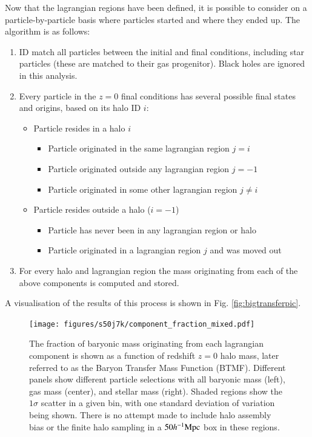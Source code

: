 Now that the lagrangian regions have been defined, it is possible to consider on
a particle-by-particle basis where particles started and where they ended up.
The algorithm is as follows:
\begin{enumerate}
	\item ID match all particles between the initial and final conditions, including
	      star particles (these are matched to their gas progenitor). Black holes
	      are ignored in this analysis.

	\item Every particle in the $z=0$ final conditions has several possible final
	      states and origins, based on its halo ID $i$:
	      \begin{itemize}
	            \item Particle resides in a halo $i$
	            \begin{itemize}
	           		\item Particle originated in the same lagrangian region $j = i$
	           		\item Particle originated outside any lagrangian region $j = -1$
	           		\item Particle originated in some other lagrangian region $j \neq i$
	            \end{itemize}
	            \item Particle resides outside a halo ($i = -1$)
	            \begin{itemize}
	            	\item Particle has never been in any lagrangian region or halo
	            	\item Particle originated in a lagrangian region $j$ and was moved out
	            \end{itemize}
	      \end{itemize}
	      
	\item For every halo and lagrangian region the mass originating from each
	      of the above components is computed and stored.
\end{enumerate}

A visualisation of the results of this process is shown in Fig. \ref{fig:bigtransferpic}.


\begin{figure}
	\centering
	\texttt{[image: figures/s50j7k/component\_fraction\_mixed.pdf]}
	\vspace{-0.7cm}
	\caption{
		The fraction of baryonic mass originating from each lagrangian component is
		shown as a function of redshift $z=0$ halo mass, later referred to as the
		Baryon Transfer Mass Function (BTMF). Different panels show different
		particle selections with all baryonic
		mass (left), gas mass (center), and stellar mass (right). Shaded
		regions show the $1\sigma$ scatter in a given bin, with one standard
		deviation of variation being shown. There is no attempt made to include
		halo assembly bias or the finite halo sampling in a $50h^{-1}{\rm Mpc}{}$ box in
		these regions.
	}
	\label{fig:maintransferresult}
\end{figure}

